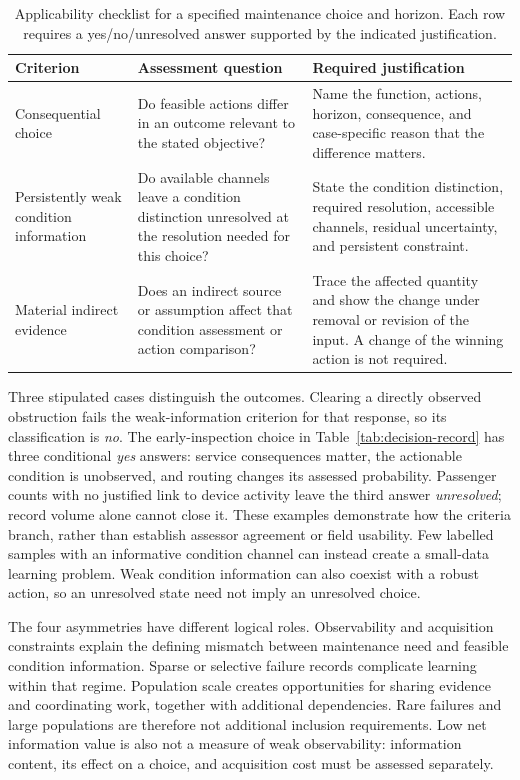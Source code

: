 \documentclass[symmetry,article,submit,pdftex,oneauthor]{Definitions/mdpi}
\begin{document}
\begin{table}[t]
\caption{Applicability checklist for a specified maintenance choice and horizon. Each row requires a yes/no/unresolved answer supported by the indicated justification.}
\label{tab:regime-boundaries}
\small
\begin{tabularx}{\linewidth}{@{}YYY@{}}
\toprule
\textbf{Criterion} & \textbf{Assessment question} & \textbf{Required justification} \\
\midrule
Consequential choice & Do feasible actions differ in an outcome relevant to the stated objective? & Name the function, actions, horizon, consequence, and case-specific reason that the difference matters. \\
Persistently weak condition information & Do available channels leave a condition distinction unresolved at the resolution needed for this choice? & State the condition distinction, required resolution, accessible channels, residual uncertainty, and persistent constraint. \\
Material indirect evidence & Does an indirect source or assumption affect that condition assessment or action comparison? & Trace the affected quantity and show the change under removal or revision of the input. A change of the winning action is not required. \\
\bottomrule
\end{tabularx}
\end{table}

Three stipulated cases distinguish the outcomes. Clearing a directly observed obstruction fails the weak-information criterion for that response, so its classification is \emph{no}. The early-inspection choice in Table~\ref{tab:decision-record} has three conditional \emph{yes} answers: service consequences matter, the actionable condition is unobserved, and routing changes its assessed probability. Passenger counts with no justified link to device activity leave the third answer \emph{unresolved}; record volume alone cannot close it. These examples demonstrate how the criteria branch, rather than establish assessor agreement or field usability. Few labelled samples with an informative condition channel can instead create a small-data learning problem. Weak condition information can also coexist with a robust action, so an unresolved state need not imply an unresolved choice.

The four asymmetries have different logical roles. Observability and acquisition constraints explain the defining mismatch between maintenance need and feasible condition information. Sparse or selective failure records complicate learning within that regime. Population scale creates opportunities for sharing evidence and coordinating work, together with additional dependencies. Rare failures and large populations are therefore not additional inclusion requirements. Low net information value is also not a measure of weak observability: information content, its effect on a choice, and acquisition cost must be assessed separately.
\end{document}

